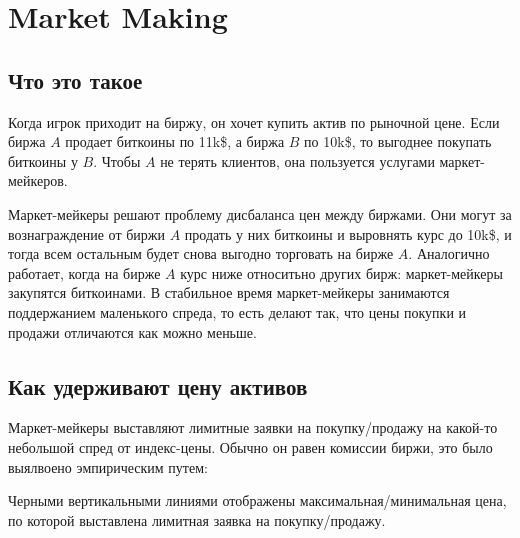 \section{Market Making}
\subsection{Что это такое}

Когда игрок приходит на биржу, он хочет купить актив по рыночной цене.
Если биржа $A$ продает биткоины по 11k\$, а биржа $B$ по 10k\$, то выгоднее покупать биткоины у $B$. Чтобы $A$ не терять клиентов, она пользуется услугами маркет-мейкеров.

Маркет-мейкеры решают проблему дисбаланса цен между биржами. Они могут за вознаграждение от биржи $A$ продать у них биткоины и выровнять курс до 10k\$, и тогда всем остальным будет снова выгодно торговать на бирже $A$. Аналогично работает, когда на бирже $A$ курс ниже относитьно других бирж: маркет-мейкеры закупятся биткоинами. В стабильное время маркет-мейкеры занимаются поддержанием маленького спреда, то есть делают так, что цены покупки и продажи отличаются как можно меньше.


\subsection{Как удерживают цену активов}

Маркет-мейкеры выставляют лимитные заявки на покупку/продажу на какой-то небольшой спред от индекс-цены. Обычно он равен комиссии биржи, это было выялвоено эмпирическим путем:

\begin{figure}[H]
\centering
{}
\end{figure}

Черными вертикальными линиями отображены максимальная/минимальная цена, по которой выставлена лимитная заявка на покупку/продажу.


